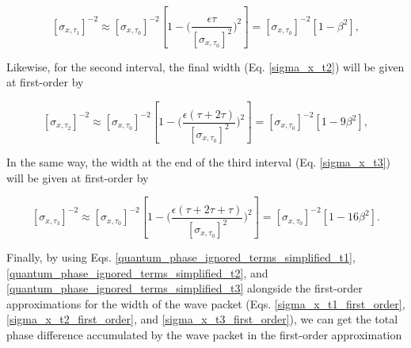\documentclass{article}
\begin{document}
\begin{equation}\label{sigma_x_t1_first_order}
[\sigma_{x, \tau_{1}}]^{-2} \approx [\sigma_{x, \tau_{0}}]^{-2}\left[1 - \bigg(\frac{\epsilon \tau}{[\sigma_{x, \tau_{0}}]^{2}}\bigg)^{2}\right] = [\sigma_{x, \tau_{0}}]^{-2}\left[1 - \beta^{2}\right],
\end{equation}

Likewise, for the second interval, the final width (Eq.  \ref{sigma_x_t2}) will be given at first-order by

\begin{equation}\label{sigma_x_t2_first_order}
[\sigma_{x, \tau_{2}}]^{-2} \approx [\sigma_{x, \tau_{0}}]^{-2}\left[1 - \bigg(\frac{\epsilon (\tau+2\tau)}{[\sigma_{x, \tau_{0}}]^{2}}\bigg)^{2}\right] = [\sigma_{x, \tau_{0}}]^{-2}\left[1 - 9\beta^{2}\right],
\end{equation}

In the same way, the width at the end of the third interval (Eq. \ref{sigma_x_t3}) will be given at first-order by 

\begin{equation}\label{sigma_x_t3_first_order}
[\sigma_{x, \tau_{3}}]^{-2} \approx [\sigma_{x, \tau_{0}}]^{-2}\left[1 - \bigg(\frac{\epsilon (\tau+2\tau+\tau)}{[\sigma_{x, \tau_{0}}]^{2}}\bigg)^{2}\right] = [\sigma_{x, \tau_{0}}]^{-2}\left[1 - 16\beta^{2}\right].
\end{equation}

Finally, by using Eqs. \ref{quantum_phase_ignored_terms_simplified_t1}, \ref{quantum_phase_ignored_terms_simplified_t2}, and \ref{quantum_phase_ignored_terms_simplified_t3} alongside the first-order approximations for the width of the wave packet (Eqs. \ref{sigma_x_t1_first_order}, \ref{sigma_x_t2_first_order}, and \ref{sigma_x_t3_first_order}), we can get the total phase difference accumulated by the wave packet in the first-order approximation
\end{document}
